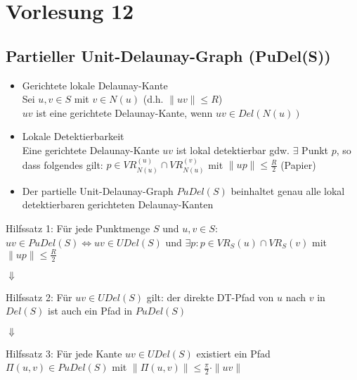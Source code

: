 \documentclass{article}
\begin{document}
\section{Vorlesung 12}
\subsection*{Partieller Unit-Delaunay-Graph (PuDel(S))}
\begin{itemize}
	\item Gerichtete lokale Delaunay-Kante \\
	Sei $u,v \in S$ mit $v \in N(u)$ (d.h. $\|uv\| \leq R$) \\
	$uv$ ist eine gerichtete Delaunay-Kante, wenn $uv \in Del(N(u))$
	\item Lokale Detektierbarkeit \\
	Eine gerichtete Delaunay-Kante $uv$ ist lokal detektierbar gdw.
	$\exists$ Punkt $p$, so dass folgendes gilt: $p \in VR_{N(u)}^{(u)} \cap
	VR_{N(u)}^{(v)}$ mit $\|up\| \leq \frac{R}{2}$ (Papier)
	\item Der partielle Unit-Delaunay-Graph $PuDel(S)$ beinhaltet genau alle
	lokal detektierbaren gerichteten Delaunay-Kanten
\end{itemize}
Hilfssatz 1: Für jede Punktmenge $S$ und $u,v \in S$: $uv \in PuDel(S)
\Leftrightarrow uv \in UDel(S)$ und $\exists p : p \in VR_S(u) \cap
VR_S(v)$ mit $\|up\| \leq \frac{R}{2}$
\begin{center} $\Downarrow$ \end{center}
Hilfssatz 2: Für $uv \in UDel(S)$ gilt: der direkte DT-Pfad von $u$ nach
$v$ in $Del(S)$ ist auch ein Pfad in $PuDel(S)$
\begin{center} $\Downarrow$ \end{center}
Hilfssatz 3: Für jede Kante $uv \in UDel(S)$ existiert ein Pfad
$\Pi(u,v) \in PuDel(S)$ mit $\|\Pi(u,v)\| \leq \frac{\pi}{2}\cdot\|uv\|$ \\
\end{document}
